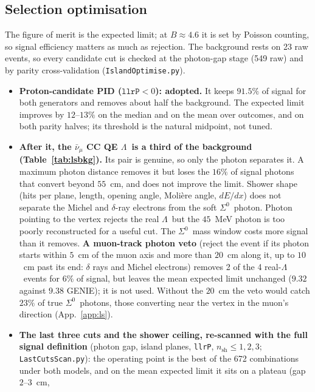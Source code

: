 \documentclass[11pt,a4paper]{article}
\newcommand{\Szero}{\ensuremath{\Sigma^{0}}}
\newcommand{\Lam}{\ensuremath{\Lambda}}
\newcommand{\numubar}{\ensuremath{\bar{\nu}_\mu}}
\begin{document}
\subsection{Selection optimisation}
\label{sec:lsopt}
The figure of merit is the expected limit; at $B\approx4.6$ it is set by Poisson
counting, so signal efficiency matters as much as rejection. The background rests on 23
raw events, so every candidate cut is checked at the photon-gap stage (549 raw) and by
parity cross-validation (\texttt{IslandOptimise.py}).
\begin{itemize}
  \item \textbf{Proton-candidate PID ($\texttt{llrP}<0$): adopted.} It keeps $91.5\%$
        of signal for both generators and removes about half the background. The expected
        limit improves by $12$--$13\%$ on the median and on the mean over outcomes, and on
        both parity halves; its threshold is the natural midpoint, not tuned.
  \item \textbf{After it, the $\numubar$ CC QE \Lam\ is a third of the background (Table~\ref{tab:lsbkg}).} Its pair is genuine,
        so only the photon separates it. A maximum photon distance removes it but loses
        the $16\%$ of signal photons that convert beyond $55$~cm, and does not improve the
        limit. Shower shape (hits per plane, length, opening angle, Moli\`ere angle,
        $dE/dx$) does not separate the Michel and $\delta$-ray electrons from the soft
        \Szero\ photon. Photon pointing to the vertex rejects the real \Lam\ but the
        $45$~MeV photon is too poorly reconstructed for a useful cut. The \Szero\ mass
        window costs more signal than it removes. \textbf{A muon-track photon veto} (reject the event if
        its photon starts within $5$~cm of the muon axis and more than $20$~cm along it, up
        to $10$~cm past its end: $\delta$ rays and Michel electrons) removes 2 of the 4
        real-\Lam\ events for $6\%$ of signal, but leaves the mean expected limit unchanged
        ($9.32$ against $9.38$ GENIE); it is not used. Without the $20$~cm the veto would
        catch $23\%$ of true \Szero\ photons, those converting near the vertex in the
        muon's direction (App.~\ref{app:ls}).
  \item \textbf{The last three cuts and the shower ceiling, re-scanned with the full signal
        definition} (photon gap, island planes, \texttt{llrP}, $n_{\mathrm{sh}}\leq1,2,3$;
        \texttt{LastCutsScan.py}): the operating point is the best of the 672 combinations
        under both models, and on the mean expected limit it sits on a plateau (gap $2$--$3$~cm,

\end{itemize}
\end{document}
